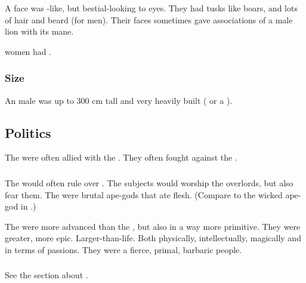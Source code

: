 A \aryoth{} face was \human-like, but bestial-looking to \human{} eyes. 
They had tusks like boars, and lots of hair and beard (for men). 
Their faces sometimes gave associations of a male lion with its mane. 

\Aryoth{} women had . 





\subsubsection{Size}
An \aryoth male was up to 300 cm tall and very heavily built ( or a \human). 











\subsection{Politics}
The \aryothim{} were often allied with the \vorcanths. 
They often fought against the \quiljaaran. 





\subsubsection{\Nephilim}
The \aryothim would often rule over \nephilim.
The \nephil subjects would worship the \aryoth overlords, but also fear them. 
The \aryothim were brutal ape-gods that ate \nephil flesh.
(Compare to the wicked ape-god in \cite{RobertEHoward:TheIsleoftheEons}.)

The \aryothim were more advanced than the \nephilim, but also in a way more primitive.
They were greater, more epic. 
Larger-than-life.
Both physically, intellectually, magically and in terms of passions. 
They were a fierce, primal, barbaric people.





\subsubsection{\Ophidians}
See the section about . 









